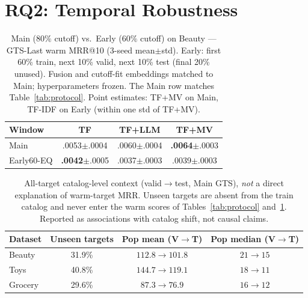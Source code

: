\documentclass[sigconf,natbib=true,anonymous]{acmart}
\newcommand{\tfidf}{\textsc{TF-IDF}\xspace}
\newcommand{\tfmv}{\textsc{TF+MV}\xspace}
\begin{document}
\section{RQ2: Temporal Robustness}
\label{sec:rq2}

\begin{table}[t]
\centering
\caption{%
Main ($80\%$ cutoff) vs.\ Early ($60\%$ cutoff) on Beauty --- GTS-Last warm MRR@10 (3-seed mean$\pm$std).
Early: first 60\% train, next 10\% valid, next 10\% test (final 20\% unused).
Fusion and cutoff-fit embeddings matched to Main; hyperparameters frozen.
The Main row matches Table~\ref{tab:protocol}.
Point estimates: \tfmv{} on Main, \tfidf{} on Early (within one std of \tfmv).%
}
\label{tab:early}
\small
\begin{tabular}{@{}lccc@{}}
\toprule
Window & TF & TF+LLM & TF+MV \\
\midrule
Main      & .0053\tiny{$\pm$.0004} & .0060\tiny{$\pm$.0004} & \textbf{.0064}\tiny{$\pm$.0003} \\
Early60-EQ & \textbf{.0042}\tiny{$\pm$.0005} & .0037\tiny{$\pm$.0003} & .0039\tiny{$\pm$.0003} \\
\bottomrule
\end{tabular}
\end{table}

\begin{table}[t]
\centering
\caption{%
All-target catalog-level context (valid$\to$test, Main GTS), \emph{not} a direct explanation of warm-target MRR.
Unseen targets are absent from the train catalog and never enter the warm scores of Tables~\ref{tab:protocol} and~\ref{tab:early}.
Reported as associations with catalog shift, not causal claims.%
}
\label{tab:shift}
\small
\setlength{\tabcolsep}{4pt}
\begin{tabular}{@{}lccc@{}}
\toprule
Dataset & Unseen targets & Pop mean (V$\to$T) & Pop median (V$\to$T) \\
\midrule
Beauty  & 31.9\% & $112.8 \to 101.8$ & $21 \to 15$ \\
Toys    & 40.8\% & $144.7 \to 119.1$ & $18 \to 11$ \\
Grocery & 29.6\% & $87.3 \to 76.9$ & $16 \to 12$ \\
\bottomrule
\end{tabular}
\end{table}
\end{document}

